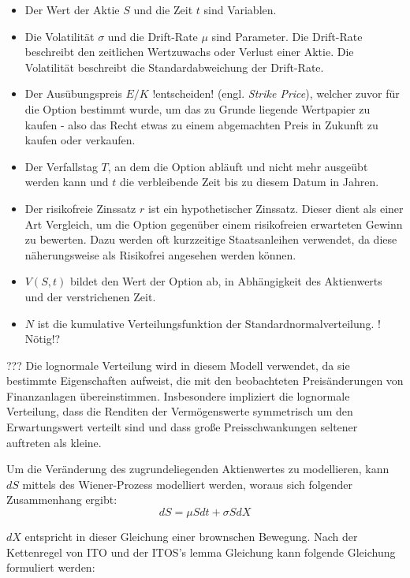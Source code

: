\begin{itemize}
	\item Der Wert der Aktie $ S $ und die Zeit $ t $  sind Variablen.
	\item Die Volatilität $ \sigma $ und die Drift-Rate $ \mu $ sind Parameter. Die Drift-Rate beschreibt den zeitlichen Wertzuwachs oder Verlust einer Aktie. Die Volatilität beschreibt die Standardabweichung der Drift-Rate.
	\item Der Ausübungspreis $ E / K $ !entscheiden! (engl. \glqq \textit{Strike Price}\glqq{}), welcher zuvor für die Option bestimmt wurde, um das zu Grunde liegende Wertpapier zu kaufen -  also das Recht etwas zu einem abgemachten Preis in Zukunft zu kaufen oder verkaufen. 
	\item Der Verfallstag $ T $, an dem die Option abläuft und nicht mehr ausgeübt werden kann und $ t $ die verbleibende Zeit bis zu diesem Datum in Jahren.
	\item Der risikofreie Zinssatz $ r $ ist ein hypothetischer Zinssatz. Dieser dient als einer Art Vergleich, um die Option gegenüber einem risikofreien erwarteten Gewinn zu bewerten. Dazu werden oft kurzzeitige Staatsanleihen verwendet, da diese näherungsweise als Risikofrei angesehen werden können.
	\item $ V(S,t) $ bildet den Wert der Option ab, in Abhängigkeit des Aktienwerts und der verstrichenen Zeit.
	\item $ N $ ist die kumulative Verteilungsfunktion der Standardnormalverteilung. ! Nötig!?
\end{itemize}

??? 
Die lognormale Verteilung wird in diesem Modell verwendet, da sie bestimmte Eigenschaften aufweist, die mit den beobachteten Preisänderungen von Finanzanlagen übereinstimmen. Insbesondere impliziert die lognormale Verteilung, dass die Renditen der Vermögenswerte symmetrisch um den Erwartungswert verteilt sind und dass große Preisschwankungen seltener auftreten als kleine.

Um die Veränderung des zugrundeliegenden Aktienwertes zu modellieren, kann $ dS $ mittels des Wiener-Prozess modelliert werden, woraus sich folgender Zusammenhang ergibt:
\begin{equation}
	dS = \mu S dt + \sigma S dX
\end{equation}

$ dX $ entspricht in dieser Gleichung einer brownschen Bewegung. Nach der Kettenregel von ITO und der ITOS's lemma Gleichung kann folgende Gleichung formuliert werden:

